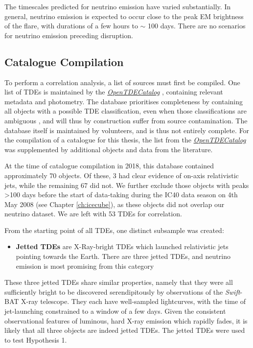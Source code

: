 The timescales predicted for neutrino emission have varied substantially. In general, neutrino emission is expected to occur close to the peak EM brightness of the flare, with durations of a few hours to $\sim$ 100 days. There are no scenarios for neutrino emission preceding disruption. 

\subsection*{Catalogue Compilation}

To perform a correlation analysis, a list of sources must first be compiled. One list of TDEs is maintained by the \emph{\href{https://tde.space/}{OpenTDECatalog}} , containing relevant metadata and photometry. The database prioritises completeness by containing all objects with a possible TDE classification, even when those classifications are ambiguous \cite{tde_catalog_paper}, and will thus by construction suffer from source contamination. The database itself is maintained by volunteers, and is thus not entirely complete. For the compilation of a catalogue for this thesis, the list from the \emph{\href{https://tde.space/}{OpenTDECatalog}} was supplemented by additional objects and data from the literature.

At the time of catalogue compilation in 2018, this database contained approximately 70 objects. Of these, 3 had clear evidence of on-axis relativistic jets, while the remaining 67 did not. We further exclude those objects with peaks >100 days before the start of data-taking during the IC40 data season on 4th May 2008 (see Chapter \ref{ch:icecube}), as these objects did not overlap our neutrino dataset. We are left with 53 TDEs for correlation.

From the starting point of all TDEs, one distinct subsample was created:

\begin{itemize}
	\item \textbf{Jetted TDEs} are X-Ray-bright TDEs which launched relativistic jets pointing towards the Earth. There are three jetted TDEs, and neutrino emission is most promising from this category
\end{itemize}

These three jetted TDEs share similar properties, namely that they were all sufficiently bright to be discovered serendipitously by observations of the \textit{Swift}-BAT X-ray telescope. They each have well-sampled lightcurves, with the time of jet-launching constrained to a window of a few days. Given the consistent observational features of luminous, hard X-ray emission which rapidly fades, it is likely that all three objects are indeed jetted TDEs. The jetted TDEs were used to test Hypothesis 1.

